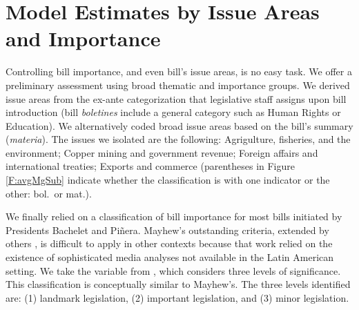 \documentclass[letter,12pt]{article}
\begin{document}

  
\section{Model Estimates by Issue Areas and Importance}

Controlling bill importance, and even bill's issue areas, is no easy task. We offer a preliminary assessment using broad thematic and importance groups. We derived issue areas from the ex-ante categorization that legislative staff assigns upon bill introduction (bill \emph{boletines} include a general category such as Human Rights or Education). We alternatively coded broad issue areas based on the bill's summary (\emph{materia}). The issues we isolated are the following: Agrigulture, fisheries, and the environment; Copper mining and government revenue; Foreign affairs and international treaties; Exports and commerce (parentheses in Figure \ref{F:avgMgSub} indicate whether the classification is with one indicator or the other: bol.\ or mat.). 

We finally relied on a classification of bill importance for most bills initiated by Presidents Bachelet and Pi\~nera. Mayhew's \citeyearpar{mayhew.1991} outstanding criteria, extended by others \citep[e.g.,]{cameron.2000,clinton.lapinski.2006}, is difficult to apply in other contexts because that work relied on the existence of sophisticated media analyses not available in the Latin American setting. We take the variable from \citet{palanza.2020}, which considers three levels of significance. This classification is conceptually similar to Mayhew's. The three levels identified are: (1) landmark legislation, (2) important legislation, and (3) minor legislation. 
\end{document}
